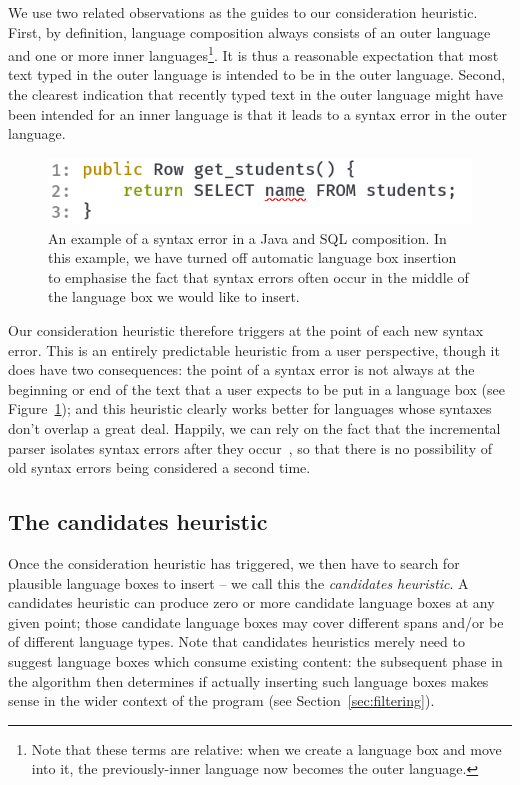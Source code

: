 \documentclass[sigplan,screen]{acmart}\settopmatter{printfolios=true,printccs=false,printacmref=false}
\begin{document}
We use two related observations as the guides to our consideration heuristic.
First, by definition, language composition always consists of an outer language
and one or more inner languages\footnote{Note that these terms are relative:
when we create a language box and move into it, the previously-inner language
now becomes the outer language.}. It is thus a reasonable expectation that most
text typed in the outer language is intended to be in the outer language.
Second, the clearest indication that recently typed text in the outer language
might have been intended for an inner language is that it leads to a syntax error
in the outer language.

\begin{figure}[tb]
    \includegraphics[width=.40\textwidth]{images/composition_error1.png}
    \caption{An example of a syntax error in a Java and SQL composition. In
      this example, we have turned off automatic language box insertion to
      emphasise the fact that syntax errors often occur in the middle of the
      language box we would like to insert.}
\label{fig:consideration}
\end{figure}

Our consideration heuristic therefore triggers at the point of each new syntax error.
This is an entirely predictable heuristic from a user perspective, though it
does have two consequences: the point of a syntax error is not always at the
beginning or end of the text that a user expects to be put in a language box
(see Figure~\ref{fig:consideration}); and this heuristic clearly works better
for languages whose syntaxes don't overlap a great deal. Happily, we can rely
on the fact that the incremental parser isolates syntax errors after they
occur~\cite[p.~93]{wagner98practicalalgorithms}, so that there is no
possibility of old syntax errors being considered a second time.


\subsection{The candidates heuristic}

Once the consideration heuristic has triggered, we then have to search for
plausible language boxes to insert -- we call this the \emph{candidates heuristic}. A candidates heuristic
can produce zero or more candidate language boxes at any given point; those
candidate language boxes may cover different spans and/or be of different
language types. Note that candidates heuristics merely need to suggest language
boxes which consume existing content: the subsequent phase in the algorithm
then determines if actually inserting such language boxes makes sense in the
wider context of the program (see Section~\ref{sec:filtering}).
\end{document}
